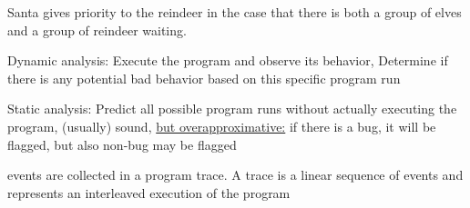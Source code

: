 \documentclass[landscape, a4paper]{article}
\begin{document}
\begin{minipage}[t]{0.2\linewidth}
	\adjustbox{scale=0.5}{
        \begin{dnumberedcodebox}[minted language=go,minted options={autogobble, fontsize=\tiny,numbersep=0.3cm,linenos}, box align=top]
          select {
            case <-deer:
              numOfDeerSeen++
            case <-elves:
              numOfElvesSeen++
              select {
                case <-deer:
                  numOfDeerSeen++
                default:
              }
          }
        \end{dnumberedcodebox}
	}
	\adjustbox{scale=0.5}{
        \begin{dnumberedcodebox}[minted language=go,minted options={autogobble, fontsize=\tiny,numbersep=0.3cm,linenos}, box align=top]
          select {
            case <-deer:
              numOfDeerSeen++
            case <-elves:
              select {
              case <-deer:
                numOfDeerSeen++
                go func() { elves <- 1 }()
              default:
                numOfElvesSeen++
              }
            }
        \end{dnumberedcodebox}
	}
	\begin{betterlist}
		\item {}
		\item Santa gives priority to the reindeer in the case that there is both a group of elves and a group of reindeer waiting.
	\end{betterlist}
	\fbox{Dynamic data race prediction}
	\begin{betterlist}
		\item \alert{Dynamic analysis}: Execute the program and observe its behavior, Determine if there is any potential bad behavior based on this specific program run
		\item \alert{Static analysis}: Predict all possible program runs without actually executing the program, (usually) sound, \underline{but overapproximative:} if there is a bug, it will be flagged, but also non-bug may be flagged
		\item events are collected in a program \alert{trace}. A trace is a linear sequence of events and represents an interleaved execution of the program
		\begin{betterlist}

\end{betterlist}
\end{betterlist}
\end{minipage}
\end{document}
